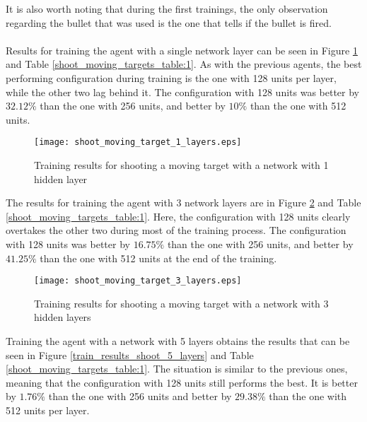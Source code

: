 It is also worth noting that during the first trainings, the only observation regarding the bullet that was used is the one that tells if the bullet is fired.

\paragraph{}
Results for training the agent with a single network layer can be seen in Figure \ref{train_results_shoot_1_layers} and Table \ref{shoot_moving_targets_table:1}. As with the previous agents, the best performing configuration during training is the one with 128 units per layer, while the other two lag behind it. The configuration with 128 units was better by $32.12\%$ than the one with 256 units, and better by $10\%$ than the one with 512 units.

\begin{figure}
    \begin{center}
        \texttt{[image: shoot\_moving\_target\_1\_layers.eps]}
        \caption{Training results for shooting a moving target with a network with 1 hidden layer}
        \label{train_results_shoot_1_layers}
    \end{center}
\end{figure}

The results for training the agent with 3 network layers are in Figure \ref{train_results_shoot_3_layers} and Table \ref{shoot_moving_targets_table:1}. Here, the configuration with 128 units clearly overtakes the other two during most of the training process. The configuration with 128 units was better by $16.75\%$ than the one with 256 units, and better by $41.25\%$ than the one with 512 units at the end of the training.

\begin{figure}
    \begin{center}
        \texttt{[image: shoot\_moving\_target\_3\_layers.eps]}
        \caption{Training results for shooting a moving target with a network with 3 hidden layers}
        \label{train_results_shoot_3_layers}
    \end{center}
\end{figure}

Training the agent with a network with 5 layers obtains the results that can be seen in Figure \ref{train_results_shoot_5_layers} and Table \ref{shoot_moving_targets_table:1}. The situation is similar to the previous ones, meaning that the configuration with 128 units still performs the best. It is better by $1.76\%$ than the one with 256 units and better by $29.38\%$ than the one with 512 units per layer.

